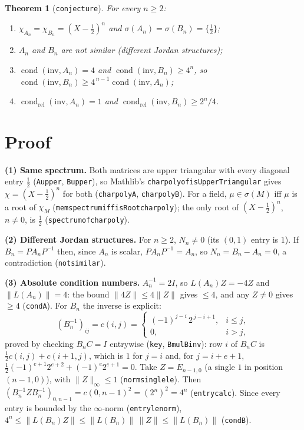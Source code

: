 \documentclass[11pt]{article}
\renewcommand{\_}{\oldus\allowbreak}
\newtheorem{theorem}{Theorem}
\theoremstyle{remark}
\newcommand{\cond}{\operatorname{cond}}
\begin{document}
\begin{theorem}[\texttt{conjecture\_5120}]\label{thm}
For every $n\ge2$:
\begin{enumerate}
\item $\chi_{A_n}=\chi_{B_n}=(X-\tfrac12)^n$ and $\sigma(A_n)=\sigma(B_n)=\{\tfrac12\}$;
\item $A_n$ and $B_n$ are not similar (different Jordan structures);
\item $\cond(\mathrm{inv},A_n)=4$ and $\cond(\mathrm{inv},B_n)\ge4^n$, so
$\cond(\mathrm{inv},B_n)\ge4^{\,n-1}\cond(\mathrm{inv},A_n)$;
\item $\cond_{\mathrm{rel}}(\mathrm{inv},A_n)=1$ and $\cond_{\mathrm{rel}}(\mathrm{inv},B_n)\ge2^n/4$.
\end{enumerate}
\end{theorem}

\section{Proof}
\textbf{(1) Same spectrum.} Both matrices are upper triangular with every diagonal entry
$\tfrac12$ (\texttt{A\_upper}, \texttt{B\_upper}), so Mathlib's
\texttt{charpoly\_of\_isUpperTriangular} gives $\chi=(X-\tfrac12)^n$ for both
(\texttt{charpoly\_A}, \texttt{charpoly\_B}). For a field, $\mu\in\sigma(M)$ iff $\mu$ is a root
of $\chi_M$ (\texttt{mem\_spectrum\_iff\_isRoot\_charpoly}); the only root of $(X-\tfrac12)^n$,
$n\ne0$, is $\tfrac12$ (\texttt{spectrum\_of\_charpoly}).

\textbf{(2) Different Jordan structures.} For $n\ge2$, $N_n\ne0$ (its $(0,1)$ entry is $1$).
If $B_n=PA_nP^{-1}$ then, since $A_n$ is scalar, $PA_nP^{-1}=A_n$, so $N_n=B_n-A_n=0$, a
contradiction (\texttt{not\_similar}).

\textbf{(3) Absolute condition numbers.} $A_n^{-1}=2I$, so $L(A_n)Z=-4Z$ and
$\|L(A_n)\|=4$: the bound $\|4Z\|\le4\|Z\|$ gives $\le4$, and any $Z\ne0$ gives $\ge4$
(\texttt{cond\_A}). For $B_n$ the inverse is explicit:
\[
(B_n^{-1})_{ij}=c(i,j)=\begin{cases}(-1)^{j-i}\,2^{\,j-i+1}, & i\le j,\\ 0,& i>j,\end{cases}
\]
proved by checking $B_nC=I$ entrywise (\texttt{key}, \texttt{B\_mul\_Binv}): row $i$ of $B_nC$ is
$\tfrac12c(i,j)+c(i+1,j)$, which is $1$ for $j=i$ and, for $j=i+e+1$,
$\tfrac12(-1)^{e+1}2^{e+2}+(-1)^e2^{e+1}=0$. Take $Z=E_{n-1,0}$ (a single $1$ in position
$(n-1,0)$), with $\|Z\|_\infty\le1$ (\texttt{norm\_single\_le}). Then
$(B_n^{-1}ZB_n^{-1})_{0,n-1}=c(0,n-1)^2=(2^n)^2=4^n$ (\texttt{entry\_calc}). Since every entry is
bounded by the $\infty$-norm (\texttt{entry\_le\_norm}),
$4^n\le\|L(B_n)Z\|\le\|L(B_n)\|\,\|Z\|\le\|L(B_n)\|$ (\texttt{cond\_B}).
\end{document}
